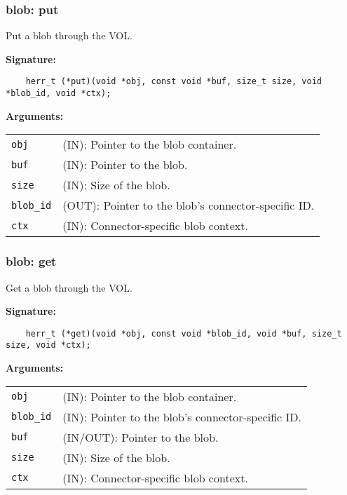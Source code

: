 \subsubsection{blob: put}
Put a blob through the VOL.

\begin{mdframed}[style=bgbox]
\textbf{Signature:}
\begin{lstlisting}
    herr_t (*put)(void *obj, const void *buf, size_t size, void *blob_id, void *ctx);
\end{lstlisting}

\textbf{Arguments:}\\
\begin{tabular}{l p{13.5cm}}
  \texttt{obj} & (IN): Pointer to the blob container.\\
  \texttt{buf} & (IN): Pointer to the blob.\\
  \texttt{size} & (IN): Size of the blob.\\
  \texttt{blob\_id} & (OUT): Pointer to the blob's connector-specific ID.\\
  \texttt{ctx} & (IN): Connector-specific blob context.\\
\end{tabular}
\end{mdframed}

\subsubsection{blob: get}
Get a blob through the VOL.

\begin{mdframed}[style=bgbox]
\textbf{Signature:}
\begin{lstlisting}
    herr_t (*get)(void *obj, const void *blob_id, void *buf, size_t size, void *ctx);
\end{lstlisting}

\textbf{Arguments:}\\
\begin{tabular}{l p{13.5cm}}
  \texttt{obj} & (IN): Pointer to the blob container.\\
  \texttt{blob\_id} & (IN): Pointer to the blob's connector-specific ID.\\
  \texttt{buf} & (IN/OUT): Pointer to the blob.\\
  \texttt{size} & (IN): Size of the blob.\\
  \texttt{ctx} & (IN): Connector-specific blob context.\\
\end{tabular}
\end{mdframed}

